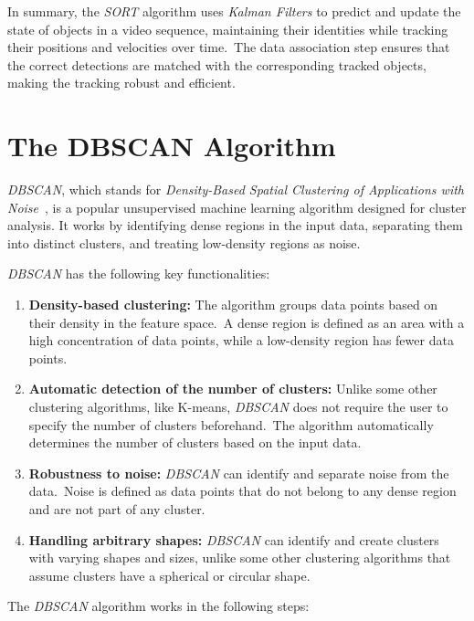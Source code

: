 In summary, the \textit{SORT} algorithm uses \textit{Kalman Filters} to predict and update the state of objects in a video sequence, maintaining their identities while tracking their positions and velocities over time.\ The data association step ensures that the correct detections are matched with the corresponding tracked objects, making the tracking robust and efficient.


\section{The DBSCAN Algorithm}
\label{sec:dbscan}

\textit{DBSCAN}, which stands for \textit{Density-Based Spatial Clustering of Applications with Noise}~\cite{schubert2017dbscan}, is a popular unsupervised machine learning algorithm designed for cluster analysis.
It works by identifying dense regions in the input data, separating them into distinct clusters, and treating low-density regions as noise.

\textit{DBSCAN} has the following key functionalities:

\begin{enumerate}
    \item \textbf{Density-based clustering:} The algorithm groups data points based on their density in the feature space.\ A dense region is defined as an area with a high concentration of data points, while a low-density region has fewer data points.
    \item \textbf{Automatic detection of the number of clusters:} Unlike some other clustering algorithms, like K-means, \textit{DBSCAN} does not require the user to specify the number of clusters beforehand.\ The algorithm automatically determines the number of clusters based on the input data.
    \item \textbf{Robustness to noise:} \textit{DBSCAN} can identify and separate noise from the data.\ Noise is defined as data points that do not belong to any dense region and are not part of any cluster.
    \item \textbf{Handling arbitrary shapes:} \textit{DBSCAN} can identify and create clusters with varying shapes and sizes, unlike some other clustering algorithms that assume clusters have a spherical or circular shape.
\end{enumerate}

The \textit{DBSCAN} algorithm works in the following steps:

